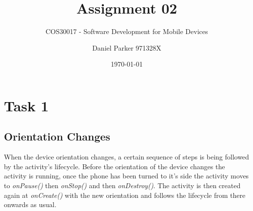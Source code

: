 \documentclass[11pt,english,numbers=endperiod,parskip=half]{scrartcl}
\title{Assignment 02}
\subtitle{COS30017 - Software Development for Mobile Devices}
\author{Daniel Parker 971328X}
\date{\today}
\begin{document}
\maketitle
\thispagestyle{empty}

\section{Task 1}
\subsection{Orientation Changes}
\raggedright
When the device orientation changes, a certain sequence of steps is being followed by the activity's lifecycle. Before the orientation of the device changes the activity is running, once the phone has been turned to it's side the activity moves to \textit{onPause()} then \textit{onStop()} and then \textit{onDestroy()}. The activity is then created again at \textit{onCreate()} with the new orientation and follows the lifecycle from there onwards as usual. \bigskip \\
\end{document}

